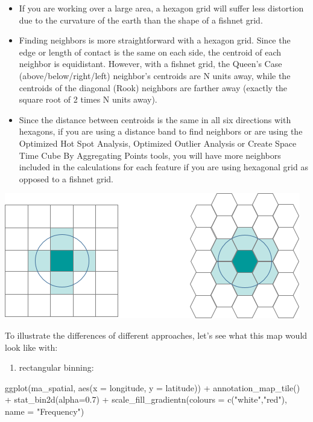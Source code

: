\documentclass[
]{book}
\newenvironment{Shaded}{\begin{snugshade}}{\end{snugshade}}
\newcommand{\AttributeTok}[1]{\textcolor[rgb]{0.77,0.63,0.00}{#1}}
\newcommand{\FloatTok}[1]{\textcolor[rgb]{0.00,0.00,0.81}{#1}}
\newcommand{\FunctionTok}[1]{\textcolor[rgb]{0.00,0.00,0.00}{#1}}
\newcommand{\NormalTok}[1]{#1}
\newcommand{\SpecialCharTok}[1]{\textcolor[rgb]{0.00,0.00,0.00}{#1}}
\newcommand{\StringTok}[1]{\textcolor[rgb]{0.31,0.60,0.02}{#1}}
\providecommand{\tightlist}{%
  \setlength{\itemsep}{0pt}\setlength{\parskip}{0pt}}
\begin{document}
\begin{itemize}
\item
  If you are working over a large area, a hexagon grid will suffer less distortion due to the curvature of the earth than the shape of a fishnet grid.
\item
  Finding neighbors is more straightforward with a hexagon grid. Since the edge or length of contact is the same on each side, the centroid of each neighbor is equidistant. However, with a fishnet grid, the Queen's Case (above/below/right/left) neighbor's centroids are N units away, while the centroids of the diagonal (Rook) neighbors are farther away (exactly the square root of 2 times N units away).
\item
  Since the distance between centroids is the same in all six directions with hexagons, if you are using a distance band to find neighbors or are using the Optimized Hot Spot Analysis, Optimized Outlier Analysis or Create Space Time Cube By Aggregating Points tools, you will have more neighbors included in the calculations for each feature if you are using hexagonal grid as opposed to a fishnet grid.
\end{itemize}

\includegraphics{img/EE17F7E03F82-web.png}

To illustrate the differences of different approaches, let's see what this map would look like with:

\begin{enumerate}
\def\labelenumi{\alph{enumi})}
\tightlist
\item
  rectangular binning:
\end{enumerate}

\begin{Shaded}
\begin{Highlighting}[]
\FunctionTok{ggplot}\NormalTok{(ma\_spatial, }\FunctionTok{aes}\NormalTok{(}\AttributeTok{x =}\NormalTok{ longitude, }\AttributeTok{y =}\NormalTok{ latitude)) }\SpecialCharTok{+} 
  \FunctionTok{annotation\_map\_tile}\NormalTok{() }\SpecialCharTok{+} 
  \FunctionTok{stat\_bin2d}\NormalTok{(}\AttributeTok{alpha=}\FloatTok{0.7}\NormalTok{) }\SpecialCharTok{+} 
  \FunctionTok{scale\_fill\_gradientn}\NormalTok{(}\AttributeTok{colours =} \FunctionTok{c}\NormalTok{(}\StringTok{"white"}\NormalTok{,}\StringTok{"red"}\NormalTok{), }
                       \AttributeTok{name =} \StringTok{"Frequency"}\NormalTok{) }
\end{Highlighting}
\end{Shaded}
\end{document}
